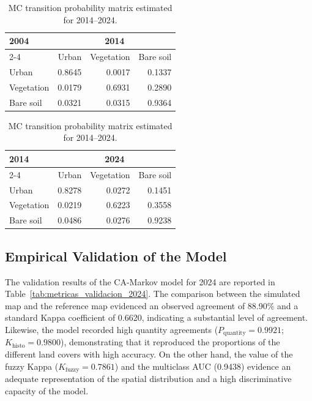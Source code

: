 \documentclass[runningheads]{llncs}
\begin{document}
\begin{table}[t]
\centering

\begin{minipage}[t]{0.48\textwidth}
\caption{MC transition probability matrix estimated for 2004--2014.}
\label{tab:markov_2004_2014}
\small
\begin{tabular}{lrrr}
\hline
\multirow{2}{*}{2004} & \multicolumn{3}{c}{2014} \\
\cline{2-4}
& Urban & Vegetation & Bare soil \\
\hline
Urban & 0.8645 & 0.0017 & 0.1337 \\
Vegetation & 0.0179 & 0.6931 & 0.2890 \\
Bare soil & 0.0321 & 0.0315 & 0.9364 \\
\hline
\end{tabular}
\end{minipage}
\hfill
\begin{minipage}[t]{0.48\textwidth}
\centering
\caption{MC transition probability matrix estimated for 2014--2024.}
\label{tab:markov_2014_2024}
\small
\begin{tabular}{lrrr}
\hline
\multirow{2}{*}{2014} & \multicolumn{3}{c}{2024} \\
\cline{2-4}
& Urban & Vegetation & Bare soil \\
\hline
Urban & 0.8278 & 0.0272 & 0.1451 \\
Vegetation & 0.0219 & 0.6223 & 0.3558 \\
Bare soil & 0.0486 & 0.0276 & 0.9238 \\
\hline
\end{tabular}
\end{minipage}
\end{table}

\subsection{Empirical Validation of the Model}
\label{subsec:res_validacion_empirica}

The validation results of the CA-Markov model for 2024 are reported in Table~\ref{tab:metricas_validacion_2024}. The comparison between the simulated map and the reference map evidenced an observed agreement of 88.90\% and a standard Kappa coefficient of 0.6620, indicating a substantial level of agreement. Likewise, the model recorded high quantity agreements ($P_{\text{quantity}} = 0.9921$; $K_{\text{histo}} = 0.9800$), demonstrating that it reproduced the proportions of the different land covers with high accuracy. On the other hand, the value of the fuzzy Kappa ($K_{\text{fuzzy}} = 0.7861$) and the multiclass AUC (0.9438) evidence an adequate representation of the spatial distribution and a high discriminative capacity of the model.
\end{document}
